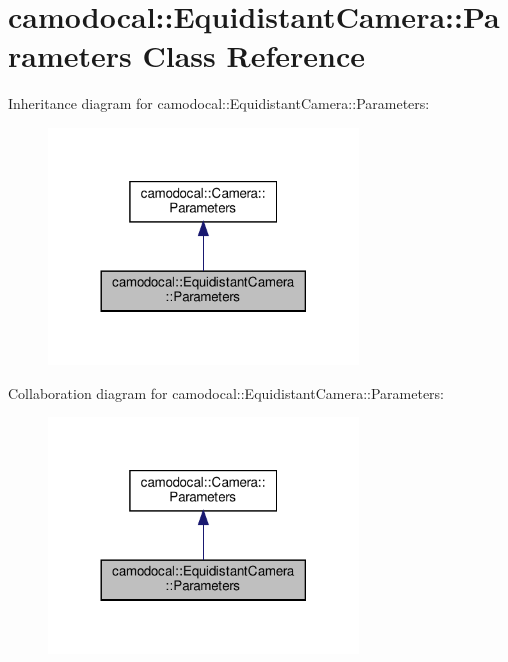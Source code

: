 \hypertarget{classcamodocal_1_1EquidistantCamera_1_1Parameters}{}\section{camodocal\+:\+:Equidistant\+Camera\+:\+:Parameters Class Reference}
\label{classcamodocal_1_1EquidistantCamera_1_1Parameters}


Inheritance diagram for camodocal\+:\+:Equidistant\+Camera\+:\+:Parameters\+:\nopagebreak
\begin{figure}[H]
\begin{center}
\leavevmode
\includegraphics[width=233pt]{classcamodocal_1_1EquidistantCamera_1_1Parameters__inherit__graph}
\end{center}
\end{figure}


Collaboration diagram for camodocal\+:\+:Equidistant\+Camera\+:\+:Parameters\+:\nopagebreak
\begin{figure}[H]
\begin{center}
\leavevmode
\includegraphics[width=233pt]{classcamodocal_1_1EquidistantCamera_1_1Parameters__coll__graph}
\end{center}
\end{figure}
